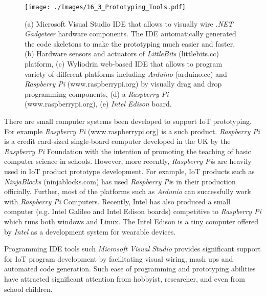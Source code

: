 \documentclass[journal]{IEEEtran}
\begin{document}
  
    \begin{figure}[!b]
     \centering
\texttt{[image: ./Images/16\_3\_Prototyping\_Tools.pdf]}
\caption{(a) Microsoft Visual Studio IDE that allows to visually wire \textit{.NET Gadgeteer} hardware components. The IDE automatically generated the code skeletons to make the prototyping much easier and faster, (b) Hardware sensors and actuators of \textit{LittleBits} (littlebits.cc) platform, (c) Wyliodrin web-based IDE that allows to program variety of different platforms including \textit{Arduino} (arduino.cc) and  \textit{Raspberry Pi} (www.raspberrypi.org) by visually drag and drop programming components, (d) a \textit{Raspberry Pi} (www.raspberrypi.org), (e) \textit{Intel Edison} board.}
     \label{Figure:Prototyping_Tools}	
    \vspace{-0.4cm}	
    \end{figure}
    
    
  There are  small computer systems been developed to support IoT prototyping. For example \textit{Raspberry Pi} (www.raspberrypi.org) is a such product.  \textit{Raspberry Pi} is a credit card-sized single-board computer developed in the UK by the \textit{Raspberry Pi} Foundation with the intention of promoting the teaching of basic computer science in schools. However, more recently, \textit{Raspberry Pi}s are heavily used in IoT product prototype development. For example, IoT products such as \textit{NinjaBlocks} (ninjablocks.com) has used \textit{Raspberry Pi}s in their production officially. Further, most of the platforms such as \textit{Ardunio} can successfully work with \textit{Raspberry Pi} Computers. Recently, Intel has also produced a small computer (e.g. Intel Galileo and Intel Edison boards) competitive to \textit{Raspberry Pi} which runs both windows and Linux. The Intel Edison is a tiny computer offered by \textit{Intel} as a development system for wearable devices.
 
 Programming IDE tools such \textit{Microsoft Visual Studio} provides significant support for IoT program development by facilitating visual  wiring,  mash ups and automated code generation. Such ease of programming and prototyping abilities have attracted significant attention from hobbyist, researcher, and even from school children.
 
\end{document}
